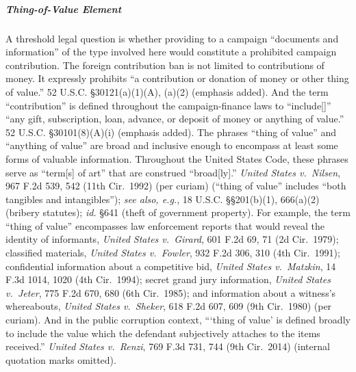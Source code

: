 \subparagraph{Thing-of-Value Element}
A threshold legal question is whether providing to a campaign ``documents and information'' of the type involved here would constitute a prohibited campaign contribution.
The foreign contribution ban is not limited to contributions of money.
It expressly prohibits ``a contribution or donation of money or other thing of value.''
52 U.S.C. \S 30121(a)(1)(A), (a)(2) (emphasis added).
And the term ``contribution'' is defined throughout the campaign-finance laws to ``include[]'' ``any gift, subscription, loan, advance, or deposit of money or anything of value.''
52 U.S.C. \S 30101(8)(A)(i) (emphasis added).
The phrases ``thing of value'' and ``anything of value'' are broad and inclusive enough to encompass at least some forms of valuable information.
Throughout the United States Code, these phrases serve as ``term[s] of art'' that are construed ``broad[ly].''
\textit{United States v.\ Nilsen}, 967 F.2d 539, 542 (11th Cir.~1992) (per curiam) (``thing of value'' includes ``both tangibles and intangibles''); \textit{see also, e.g.}, 18 U.S.C. \S\S 201(b)(1), 666(a)(2) (bribery statutes); \textit{id.} \S 641 (theft of government property).
For example, the term ``thing of value'' encompasses law enforcement reports that would reveal the identity of informants, \textit{United States v.\ Girard}, 601 F.2d 69, 71 (2d Cir.~1979); classified materials, \textit{United States v.\ Fowler}, 932 F.2d 306, 310 (4th Cir.~1991); confidential information about a competitive bid, \textit{United States v.\ Matzkin}, 14 F.3d 1014, 1020 (4th Cir.~1994); secret grand jury information, \textit{United States v.\ Jeter}, 775 F.2d 670, 680 (6th Cir.~1985); and information about a witness's whereabouts, \textit{United States v.\ Sheker}, 618 F.2d 607, 609 (9th Cir.~1980) (per curiam).
And in the public corruption context, ```thing of value' is defined broadly to include the value which the defendant subjectively attaches to the items received.''
\textit{United States v.\ Renzi}, 769 F.3d 731, 744 (9th Cir.~2014) (internal quotation marks omitted).

